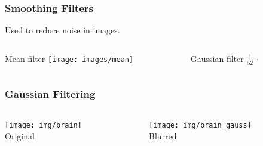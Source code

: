 \begin{frame}
    \frametitle{Smoothing Filters}
    Used to reduce noise in images.
    \begin{columns}[T, onlytextwidth]
        \begin{column}{0.45\textwidth}
            \begin{block}{Mean filter}\centering\bigskip\bigskip
                \texttt{[image: images/mean]}
            \end{block}
        \end{column}
        \begin{column}{0.45\textwidth}
            \begin{block}{Gaussian filter}\centering\bigskip\bigskip
                $\displaystyle\frac{1}{52}\,\cdot\,$ 
            \end{block}
        \end{column}
    \end{columns}
\end{frame}

\begin{frame}
    \frametitle{Gaussian Filtering}
    \begin{columns}[onlytextwidth]
        \begin{column}{0.5\textwidth}\centering
            \centering{}
            \texttt{[image: img/brain]}\\Original
        \end{column}%
        \begin{column}{0.5\textwidth}\centering
            \centering{}
            \texttt{[image: img/brain\_gauss]}\\Blurred
        \end{column}
    \end{columns}
\end{frame}




